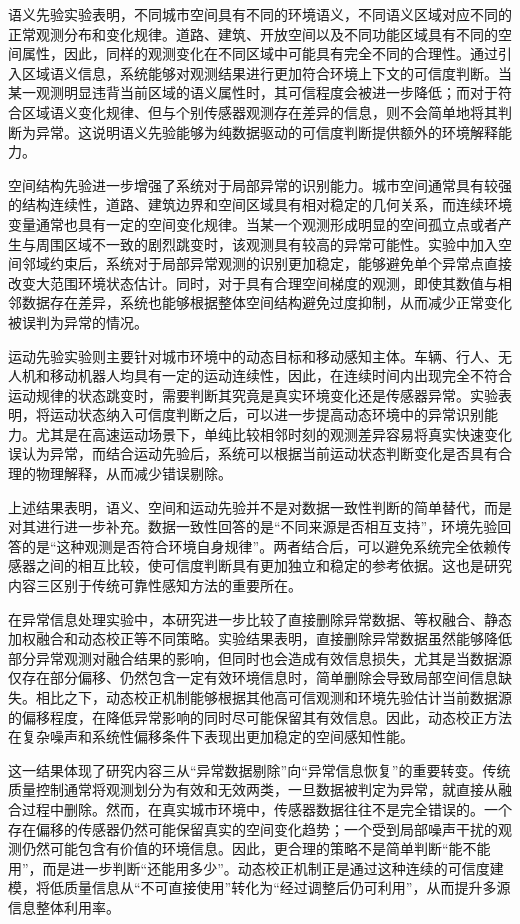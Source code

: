 语义先验实验表明，不同城市空间具有不同的环境语义，不同语义区域对应不同的正常观测分布和变化规律。道路、建筑、开放空间以及不同功能区域具有不同的空间属性，因此，同样的观测变化在不同区域中可能具有完全不同的合理性。通过引入区域语义信息，系统能够对观测结果进行更加符合环境上下文的可信度判断。当某一观测明显违背当前区域的语义属性时，其可信程度会被进一步降低；而对于符合区域语义变化规律、但与个别传感器观测存在差异的信息，则不会简单地将其判断为异常。这说明语义先验能够为纯数据驱动的可信度判断提供额外的环境解释能力。

空间结构先验进一步增强了系统对于局部异常的识别能力。城市空间通常具有较强的结构连续性，道路、建筑边界和空间区域具有相对稳定的几何关系，而连续环境变量通常也具有一定的空间变化规律。当某一个观测形成明显的空间孤立点或者产生与周围区域不一致的剧烈跳变时，该观测具有较高的异常可能性。实验中加入空间邻域约束后，系统对于局部异常观测的识别更加稳定，能够避免单个异常点直接改变大范围环境状态估计。同时，对于具有合理空间梯度的观测，即使其数值与相邻数据存在差异，系统也能够根据整体空间结构避免过度抑制，从而减少正常变化被误判为异常的情况。

运动先验实验则主要针对城市环境中的动态目标和移动感知主体。车辆、行人、无人机和移动机器人均具有一定的运动连续性，因此，在连续时间内出现完全不符合运动规律的状态跳变时，需要判断其究竟是真实环境变化还是传感器异常。实验表明，将运动状态纳入可信度判断之后，可以进一步提高动态环境中的异常识别能力。尤其是在高速运动场景下，单纯比较相邻时刻的观测差异容易将真实快速变化误认为异常，而结合运动先验后，系统可以根据当前运动状态判断变化是否具有合理的物理解释，从而减少错误剔除。

上述结果表明，语义、空间和运动先验并不是对数据一致性判断的简单替代，而是对其进行进一步补充。数据一致性回答的是“不同来源是否相互支持”，环境先验回答的是“这种观测是否符合环境自身规律”。两者结合后，可以避免系统完全依赖传感器之间的相互比较，使可信度判断具有更加独立和稳定的参考依据。这也是研究内容三区别于传统可靠性感知方法的重要所在。

在异常信息处理实验中，本研究进一步比较了直接删除异常数据、等权融合、静态加权融合和动态校正等不同策略。实验结果表明，直接删除异常数据虽然能够降低部分异常观测对融合结果的影响，但同时也会造成有效信息损失，尤其是当数据源仅存在部分偏移、仍然包含一定有效环境信息时，简单删除会导致局部空间信息缺失。相比之下，动态校正机制能够根据其他高可信观测和环境先验估计当前数据源的偏移程度，在降低异常影响的同时尽可能保留其有效信息。因此，动态校正方法在复杂噪声和系统性偏移条件下表现出更加稳定的空间感知性能。

这一结果体现了研究内容三从“异常数据剔除”向“异常信息恢复”的重要转变。传统质量控制通常将观测划分为有效和无效两类，一旦数据被判定为异常，就直接从融合过程中删除。然而，在真实城市环境中，传感器数据往往不是完全错误的。一个存在偏移的传感器仍然可能保留真实的空间变化趋势；一个受到局部噪声干扰的观测仍然可能包含有价值的环境信息。因此，更合理的策略不是简单判断“能不能用”，而是进一步判断“还能用多少”。动态校正机制正是通过这种连续的可信度建模，将低质量信息从“不可直接使用”转化为“经过调整后仍可利用”，从而提升多源信息整体利用率。

